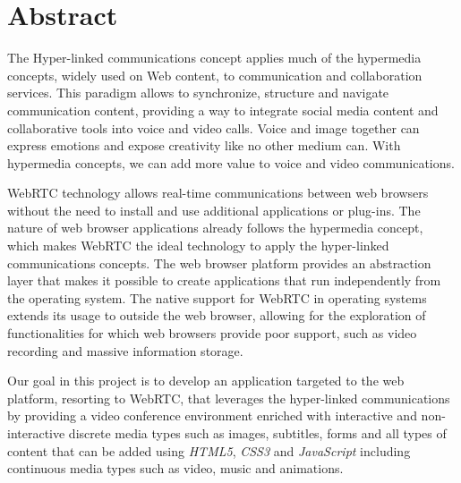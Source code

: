 \chapter*{Abstract}


The Hyper-linked communications concept applies much of the hypermedia concepts, widely used on Web content, to communication and collaboration services. This paradigm allows to synchronize, structure and navigate communication content, providing a way to integrate social media content and collaborative tools into voice and video calls.
Voice and image together can express emotions and expose creativity like no other medium can. With hypermedia concepts, we can add more value to voice and video communications.

\ac{WebRTC} technology allows real-time communications between web browsers without the need to install and use additional applications or plug-ins. The nature of web browser applications already follows the hypermedia concept, which makes \ac{WebRTC} the ideal technology to apply the hyper-linked communications concepts.
{\color{blue}The web browser platform provides an abstraction layer that makes it possible to create applications that run independently from the operating system.}
The native support for \ac{WebRTC} in operating systems extends its usage to outside the web browser, allowing for the exploration of functionalities for which web browsers provide poor support, such as video recording and massive information storage.



{\color{red}Our goal in this project is to develop an application targeted to the web platform, resorting to \ac{WebRTC}, that leverages the hyper-linked communications by providing a video conference environment enriched with interactive and non-interactive discrete media types such as images, subtitles, forms and all types of content that can be added using \emph{HTML5}, \emph{CSS3} and \emph{JavaScript} including continuous media types such as video, music and animations.}

